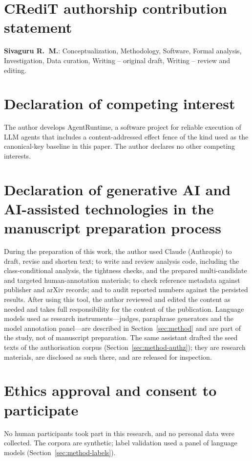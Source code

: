 \section*{CRediT authorship contribution statement}
\textbf{Sivaguru R.~M.}: Conceptualization, Methodology, Software, Formal analysis, Investigation, Data curation, Writing -- original draft, Writing -- review and editing.

\section*{Declaration of competing interest}
The author develops AgentRuntime, a software project for reliable execution of LLM agents that includes a content-addressed effect fence of the kind used as the canonical-key baseline in this paper. The author declares no other competing interests.

\section*{Declaration of generative AI and AI-assisted technologies in the manuscript preparation process}
During the preparation of this work, the author used Claude (Anthropic) to draft, revise and shorten text; to write and review analysis code, including the class-conditional analysis, the tightness checks, and the prepared multi-candidate and targeted human-annotation materials; to check reference metadata against publisher and arXiv records; and to audit reported numbers against the persisted results. After using this tool, the author reviewed and edited the content as needed and takes full responsibility for the content of the publication. Language models used as research instruments---judges, paraphrase generators and the model annotation panel---are described in Section~\ref{sec:method} and are part of the study, not of manuscript preparation. The same assistant drafted the seed texts of the authorisation corpus (Section~\ref{sec:method-authz}); they are research materials, are disclosed as such there, and are released for inspection.

\section*{Ethics approval and consent to participate}
No human participants took part in this research, and no personal data were collected. The corpora are synthetic; label validation used a panel of language models (Section~\ref{sec:method-labels}).

